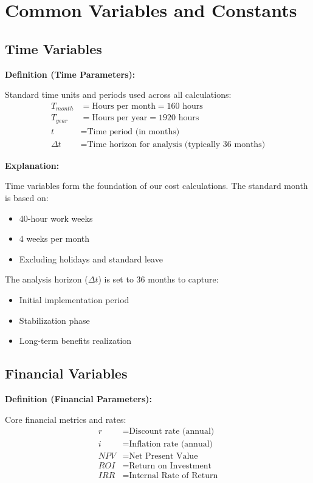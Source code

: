 \documentclass[12pt,a4paper]{article}
\newenvironment{definition}[1]
{\begin{mdframed}[style=definitionstyle]
\textbf{Definition (#1):}\par}
{\end{mdframed}}
\newenvironment{explanation}
{\begin{mdframed}[style=explanationstyle]
\textbf{Explanation:}\par}
{\end{mdframed}}
\begin{document}
\section{Common Variables and Constants}
\subsection{Time Variables}
\begin{definition}{Time Parameters}
Standard time units and periods used across all calculations:
\begin{align*}
    T_{month} &= \text{Hours per month} = 160 \text{ hours} \\
    T_{year} &= \text{Hours per year} = 1920 \text{ hours} \\
    t &= \text{Time period (in months)} \\
    \Delta t &= \text{Time horizon for analysis (typically 36 months)}
\end{align*}
\end{definition}

\begin{explanation}
Time variables form the foundation of our cost calculations. The standard month is based on:
\begin{itemize}
    \item 40-hour work weeks
    \item 4 weeks per month
    \item Excluding holidays and standard leave
\end{itemize}
The analysis horizon ($\Delta t$) is set to 36 months to capture:
\begin{itemize}
    \item Initial implementation period
    \item Stabilization phase
    \item Long-term benefits realization
\end{itemize}
\end{explanation}

\subsection{Financial Variables}
\begin{definition}{Financial Parameters}
Core financial metrics and rates:
\begin{align*}
    r &= \text{Discount rate (annual)} \\
    i &= \text{Inflation rate (annual)} \\
    NPV &= \text{Net Present Value} \\
    ROI &= \text{Return on Investment} \\
    IRR &= \text{Internal Rate of Return}
\end{align*}
\end{definition}
\end{document}
